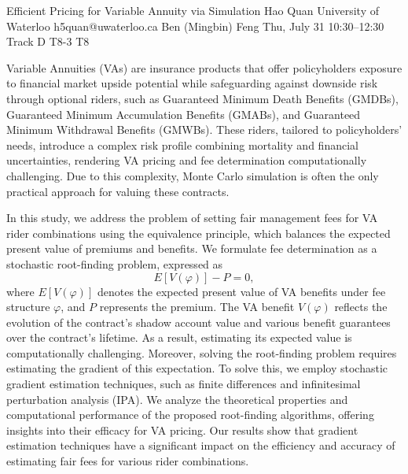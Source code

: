 \begin{talk}
  {Efficient Pricing for Variable Annuity via Simulation}%
  {Hao Quan}%
  {University of Waterloo}%
  {h5quan@uwaterloo.ca}%
  {Ben (Mingbin) Feng}%
  {}%
  {Thu, July 31 10:30–12:30 Track D}%
  {T8-3}%
  {T8}%

Variable Annuities (VAs) are insurance products that offer policyholders exposure to financial market upside potential while safeguarding against downside risk through optional riders, such as Guaranteed Minimum Death Benefits (GMDBs), Guaranteed Minimum Accumulation Benefits (GMABs), and Guaranteed Minimum Withdrawal Benefits (GMWBs). These riders, tailored to policyholders’ needs, introduce a complex risk profile combining mortality and financial uncertainties, rendering VA pricing and fee determination computationally challenging. Due to this complexity, Monte Carlo simulation is often the only practical approach for valuing these contracts.

In this study, we address the problem of setting fair management fees for VA rider combinations using the equivalence principle, which balances the expected present value of premiums and benefits. We formulate fee determination as a stochastic root-finding problem, expressed as
\[
E[V(\varphi)] - P = 0,
\]
where \( E[V(\varphi)] \) denotes the expected present value of VA benefits under fee structure \( \varphi \), and \( P \) represents the premium. The VA benefit \( V(\varphi) \) reflects the evolution of the contract’s shadow account value and various benefit guarantees over the contract’s lifetime. As a result, estimating its expected value is computationally challenging. Moreover, solving the root-finding problem requires estimating the gradient of this expectation. To solve this, we employ stochastic gradient estimation techniques, such as finite differences and infinitesimal perturbation analysis (IPA). We analyze the theoretical properties and computational performance of the proposed root-finding algorithms, offering insights into their efficacy for VA pricing. Our results show that gradient estimation techniques have a significant impact on the efficiency and accuracy of estimating fair fees for various rider combinations.
\end{talk}
